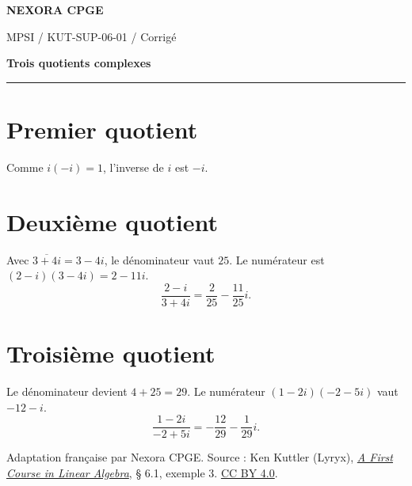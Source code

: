 \documentclass[11pt,a4paper]{article}
\begin{document}
{\small\bfseries\color{nexorablue} NEXORA CPGE}\par
{\small MPSI / KUT-SUP-06-01 / Corrigé}\par
{\LARGE\bfseries Trois quotients complexes}\par
\vspace{0.25em}\hrule\vspace{0.6em}

\section*{Premier quotient}
Comme $i(-i)=1$, l’inverse de $i$ est $-i$.

\section*{Deuxième quotient}
Avec $\overline{3+4i}=3-4i$, le dénominateur vaut $25$. Le numérateur est $(2-i)(3-4i)=2-11i$.
\[ \frac{2-i}{3+4i}=\frac2{25}-\frac{11}{25}i. \]

\section*{Troisième quotient}
Le dénominateur devient $4+25=29$. Le numérateur $(1-2i)(-2-5i)$ vaut $-12-i$.
\[ \frac{1-2i}{-2+5i}=-\frac{12}{29}-\frac1{29}i. \]

\bigskip
{\footnotesize Adaptation française par Nexora CPGE. Source : Ken Kuttler (Lyryx),
\href{https://math.libretexts.org/Bookshelves/Linear_Algebra/A_First_Course_in_Linear_Algebra_(Kuttler)/06\%253A_Complex_Numbers/6.01\%253A_Complex_Numbers}{\textit{A First Course in Linear Algebra}}, § 6.1, exemple 3.
\href{https://creativecommons.org/licenses/by/4.0/}{CC BY 4.0}.}
\end{document}
